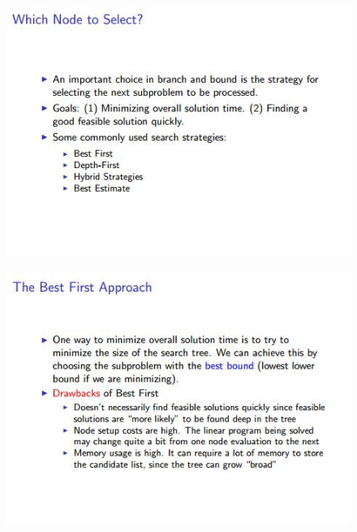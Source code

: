 \documentclass{beamer}
\begin{document}
	\begin{frame}

		\begin{figure}
			\centering
			\includegraphics[width=1.2\linewidth]{NodeSelection2}
		\end{figure}
	\end{frame}
	\begin{frame}

		\begin{figure}
			\centering
			\includegraphics[width=1.15\linewidth]{NodeSelection3}
		\end{figure}
	\end{frame}
\end{document}

